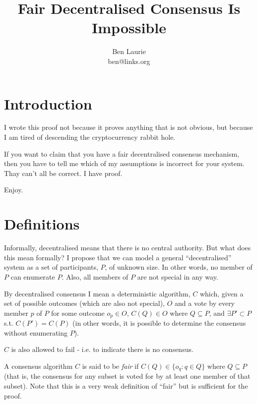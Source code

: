 \documentclass[a4paper]{article}
\title{Fair Decentralised Consensus Is Impossible}
\author{Ben Laurie \\
ben@links.org}
\begin{document}
\maketitle

\def\mod#1{\,(\textrm{mod}\,#1)}
\def\implies{\Rightarrow}
\def\qe#1{\begin{equation}#1\end{equation}}
\def\qearray#1{\begin{eqnarray}#1\end{eqnarray}}
\def\oneway#1{\textrm{oneway}(#1)}
\def\preoneway#1{\textrm{preoneway}(#1)}

\setlength{\parindent}{0pt}
\setlength{\parskip}{1ex plus 0.5ex minus 0.2ex}

\section{Introduction}

I wrote this proof not because it proves anything that is not obvious,
but because I am tired of descending the cryptocurrency rabbit hole.

If you want to claim that you have a fair decentralised consensus
mechanism, then you have to tell me which of my assumptions is
incorrect for your system. Thay can't all be correct. I have proof.

Enjoy.

\section{Definitions}

Informally, decentralised means that there is no central
authority. But what does this mean formally? I propose that we can
model a general ``decentralised'' system as a set of participants,
$P$, of unknown size. In other words, no member of $P$ can enumerate
$P$. Also, all members of $P$ are not special in any way.

By decentralised consensus I mean a deterministic algorithm, $C$
which, given a set of possible outcomes (which are also not special),
$O$ and a vote by every member $p$ of $P$ for some outcome $o_p \in
O$, $C(Q) \in O$ where $Q \subseteq P$, and $\exists P' \subset P$
s.t. $C(P') = C(P)$ (in other words, it is possible to determine the
consensus without enumerating $P$).

$C$ is also allowed to fail - i.e. to indicate there is no consensus.

A consensus algorithm $C$ is said to be {\it fair} if  $C(Q)
\in \{o_q : q \in Q\}$ where $Q \subseteq P$ (that is, the consensus
for any subset is voted for by at least one member of that
subset). Note that this is a very weak definition of ``fair'' but is
sufficient for the proof.
\end{document}

